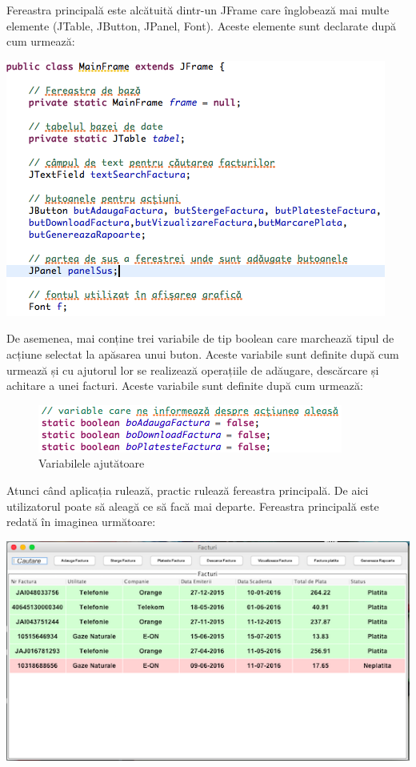 \documentclass[12pt]{book}
\begin{document}
Fereastra principală este alcătuită dintr-un JFrame care înglobează mai multe elemente (JTable, JButton, JPanel, Font). Aceste elemente sunt declarate după cum urmează:
\begin{center}
	\includegraphics{FereastraPrincipala}
\end{center}

De asemenea, mai conține trei variabile de tip boolean care marchează tipul de acțiune selectat la apăsarea unui buton. Aceste variabile sunt definite după cum urmează și cu ajutorul lor se realizează operațiile de adăugare, descărcare și achitare a unei facturi.
Aceste variabile sunt definite după cum urmează:
\begin{figure}[h]
	\centering
	\includegraphics{VariabileAjutatoare}
	\caption{Variabilele ajutătoare}
\end{figure}

Atunci când aplicația rulează, practic rulează fereastra principală. De aici utilizatorul poate să aleagă ce să facă mai departe. Fereastra principală este redată în imaginea următoare:
\begin{center}
	\includegraphics{FereastraPrincipalaVizualizare}
\end{center}
\end{document}
